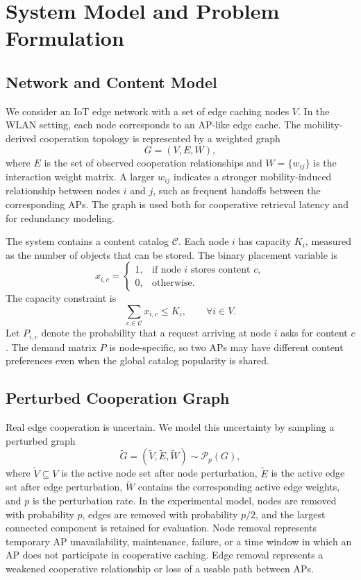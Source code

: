 \section{System Model and Problem Formulation}

\subsection{Network and Content Model}

We consider an IoT edge network with a set of edge caching nodes \(V\). In the WLAN setting, each node corresponds to an AP-like edge cache. The mobility-derived cooperation topology is represented by a weighted graph
\[
G=(V,E,W),
\]
where \(E\) is the set of observed cooperation relationships and \(W=\{w_{ij}\}\) is the interaction weight matrix. A larger \(w_{ij}\) indicates a stronger mobility-induced relationship between nodes \(i\) and \(j\), such as frequent handoffs between the corresponding APs. The graph is used both for cooperative retrieval latency and for redundancy modeling.

The system contains a content catalog \(\mathcal{C}\). Each node \(i\) has capacity \(K_i\), measured as the number of objects that can be stored. The binary placement variable is
\[
x_{i,c} =
\begin{cases}
1, & \text{if node } i \text{ stores content } c,\\
0, & \text{otherwise.}
\end{cases}
\]
The capacity constraint is
\[
\sum_{c \in \mathcal{C}} x_{i,c} \le K_i, \qquad \forall i \in V.
\]
Let \(P_{i,c}\) denote the probability that a request arriving at node \(i\) asks for content \(c\). The demand matrix \(P\) is node-specific, so two APs may have different content preferences even when the global catalog popularity is shared.

\subsection{Perturbed Cooperation Graph}

Real edge cooperation is uncertain. We model this uncertainty by sampling a perturbed graph
\[
\tilde{G}=(\tilde{V},\tilde{E},\tilde{W}) \sim \mathcal{P}_p(G),
\]
where \(\tilde{V}\subseteq V\) is the active node set after node perturbation, \(\tilde{E}\) is the active edge set after edge perturbation, \(\tilde{W}\) contains the corresponding active edge weights, and \(p\) is the perturbation rate. In the experimental model, nodes are removed with probability \(p\), edges are removed with probability \(p/2\), and the largest connected component is retained for evaluation. Node removal represents temporary AP unavailability, maintenance, failure, or a time window in which an AP does not participate in cooperative caching. Edge removal represents a weakened cooperative relationship or loss of a usable path between APs.

